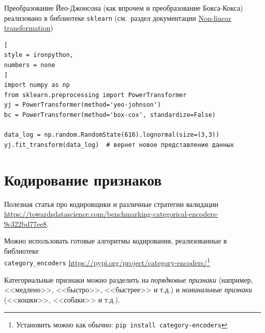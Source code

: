\documentclass[%
	11pt,
	a4paper,
	utf8,
		]{article}
\begin{document}
Преобразование Йео-Джонсона (как впрочем и преобразование Бокса-Кокса) реализовано в библиотеке \texttt{sklearn} (см.~раздел документации \href{https://scikit-learn.org/stable/modules/preprocessing.html#preprocessing-transformer}{Non-linear transformation})
\begin{lstlisting}[
style = ironpython,
numbers = none
]
import numpy as np
from sklearn.preprocessing import PowerTransformer
yj = PowerTransformer(method='yeo-johnson')
bc = PowerTransformer(method='box-cox', standardize=False)

data_log = np.random.RandomState(616).lognormal(size=(3,3))
yj.fit_transform(data_log)  # вернет новое представление данных
\end{lstlisting}



\section{Кодирование признаков}

Полезная статья про кодировщики и различные стратегии валидации \url{https://towardsdatascience.com/benchmarking-categorical-encoders-9c322bd77ee8}.

Можно использовать готовые алгоритмы кодирования, реализованные в библиотеке\\ \texttt{category\_encoders} \url{https://pypi.org/project/category-encoders/}\footnote{Установить можно как обычно: \texttt{pip install category-encoders}}

Категориальные признаки можно разделить на \emph{порядковые признаки} (например, <<медлено>>, <<быстро>>, <<быстрее>> и т.д.) и \emph{номинальные признаки} (<<кошки>>, <<собаки>> и т.д.).
\end{document}
